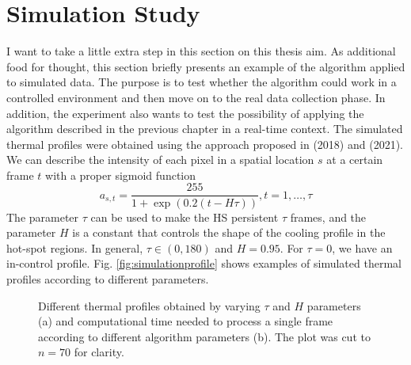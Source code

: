 \section{Simulation Study}
\label{sec:simstudy}
I want to take a little extra step in this section on this thesis aim. As additional food for thought, this section briefly presents an example of the algorithm applied to simulated data. The purpose is to test whether the algorithm could work in a controlled environment and then move on to the real data collection phase. In addition, the experiment also wants to test the possibility of applying the algorithm described in the previous chapter in a real-time context. The simulated thermal profiles were obtained using the approach proposed in \cite{colosimo_spatially_2018} (2018) and \citeauthor{yan_real-time_2021} (2021). We can describe the intensity of each pixel in a spatial location $s$ at a certain frame $t$ with a proper sigmoid function
\begin{equation}
    \label{eq:simulation}
    a_{s, t}=\frac{255}{1+\exp (0.2(t-H \tau))}, t=1, \ldots, \tau
\end{equation}
The parameter $\tau$ can be used to make the HS persistent $\tau$ frames, and the parameter $H$ is a constant that controls the shape of the cooling profile in the hot-spot regions. In general, $\tau \in \left(0,180\right)$ and $H=0.95$. For $\tau=0$, we have an in-control profile. Fig. \ref{fig:simulationprofile} shows examples of simulated thermal profiles according to different parameters.
\begin{figure}
    \centering
    \quad

   \caption[Simulated profiles and computational time.]{Different thermal profiles obtained by varying $\tau$ and $H$ parameters (a) and computational time needed to process a single frame according to different algorithm parameters (b). The plot was cut to $n=70$ for clarity.}
    
\end{figure}
